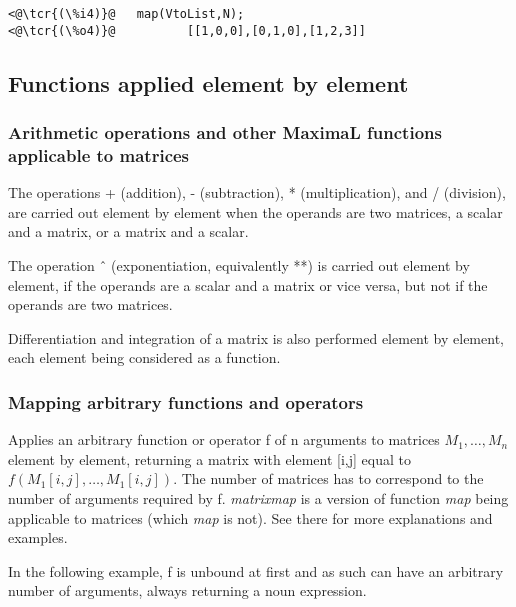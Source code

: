 \documentclass[../Maxima_Workbook.tex]{subfiles}
\begin{document}
\lz \begin{small}
\color{blue}
\begin{lstlisting}
<@\tcr{(\%i4)}@   map(VtoList,N);
<@\tcr{(\%o4)}@		     [[1,0,0],[0,1,0],[1,2,3]]
\end{lstlisting}
\color{black}
\end{small} \vspace{-4mm}

\subsection{Functions applied element by element}

\subsubsection{Arithmetic operations and other MaximaL functions applicable to matrices}

The operations + (addition), - (subtraction), * (multiplication), and / (division), are carried out element by element when the operands are two matrices, a scalar and a matrix, or a matrix and a scalar. 

\lz The operation \^ \ 
(exponentiation, equivalently **) is carried out element by element, if the operands are a scalar and a matrix or vice versa, but not if the operands are two matrices.

\lz Differentiation and integration of a matrix is also performed element by element, each element being considered as a function.

\subsubsection{Mapping arbitrary functions and operators}

\lz {} \hfill \tcr{[function]}

\lz Applies an arbitrary function or operator f of n arguments to matrices $ M_1,\dots,M_n $ element by element, returning a matrix with element [i,j] equal to $ f(M_1[i,j], \dots, M_1[i,j]) $. The number of matrices has to correspond to the number of arguments required by f. \emph{matrixmap} is a version of function \emph{map} being applicable to matrices (which \emph{map} is not). See there for more explanations and examples.

\lz In the following example, f is unbound at first and as such can have an arbitrary number of arguments, always returning a noun expression.
\end{document}
